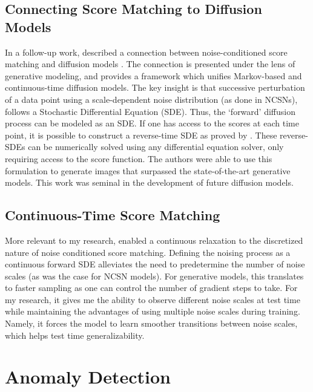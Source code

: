 
\subsection*{Connecting Score Matching to Diffusion Models}

In a follow-up work, \cite{song2020score} described a connection between noise-conditioned score matching and diffusion models \cite{sohl2015deep}. The connection is presented under the lens of generative modeling, and provides a framework which unifies Markov-based and continuous-time diffusion models. The key insight is that successive perturbation of a data point using a scale-dependent noise distribution (as done in NCSNs), follows a Stochastic Differential Equation (SDE). Thus, the `forward' diffusion process can be modeled as an SDE. If one has access to the scores at each time point, it is possible to construct a reverse-time SDE as proved by \cite{anderson1982reverse}. These reverse-SDEs can be numerically solved using any differential equation solver, only requiring access to the score function. The authors were able to use this formulation to generate images that surpassed the state-of-the-art generative models. This work was seminal in the development of future diffusion models.

\subsection*{Continuous-Time Score Matching}
More relevant to my research, \cite{song2020score} enabled a continuous relaxation to the discretized nature of noise conditioned score matching. Defining the noising process as a continuous forward SDE alleviates the need to predetermine the number of noise scales (as was the case for NCSN models). For generative models, this translates to faster sampling as one can control the number of gradient steps to take. For my research, it gives me the ability to observe different noise scales at test time while maintaining the advantages of using multiple noise scales during training. Namely, it forces the model to learn smoother transitions between noise scales, which helps test time generalizability.

\section{Anomaly Detection}

